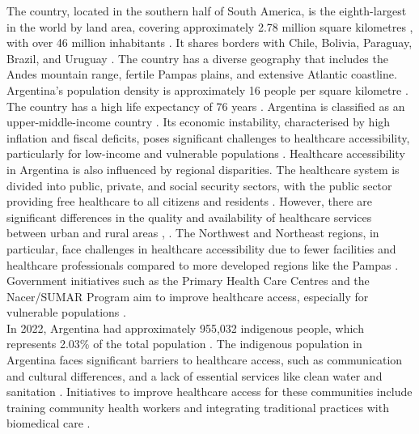 \documentclass[11pt, a4paper]{report}
\begin{document}
The country, located in the southern half of South America, is the eighth-largest in the world by land area, covering approximately 2.78 million square kilometres \citep{runfola_geoboundaries_2020}, with over 46 million inhabitants \citep{united_nations_world_2022}. It shares borders with Chile, Bolivia, Paraguay, Brazil, and Uruguay \citep{runfola_geoboundaries_2020}. The country has a diverse geography that includes the Andes mountain range, fertile Pampas plains, and extensive Atlantic coastline.  \\
%
Argentina's population density is approximately 16 people per square kilometre \citep{united_nations_world_2022}.
The country has a high life expectancy of 76 years \citep{world_bank_life_2022}. 
%
Argentina is classified as an upper-middle-income country \citep{world_bank_world_2022}. Its economic instability, characterised by high inflation and fiscal deficits, poses significant challenges to healthcare accessibility, particularly for low-income and vulnerable populations \citep{world_bank_world_2024}. 
Healthcare accessibility in Argentina is also influenced by regional disparities. The healthcare system is divided into public, private, and social security sectors, with the public sector providing free healthcare to all citizens and residents \citep{bello_health_2011}. However, there are significant differences in the quality and availability of healthcare services between urban and rural areas \citep{vacarezza_exploring_2023}, \citep{palacios_need_2020}. The Northwest and Northeast regions, in particular, face challenges in healthcare accessibility due to fewer facilities and healthcare professionals compared to more developed regions like the Pampas \citep{gilardino_access_2016}. Government initiatives such as the Primary Health Care Centres and the Nacer/SUMAR Program aim to improve healthcare access, especially for vulnerable populations \citep{palacios_need_2020}. \\
%
In 2022, Argentina had approximately 955,032 indigenous people, which represents 2.03\% of the total population \citep{berger_indigenous_2024}. The indigenous population in Argentina faces significant barriers to healthcare access, such as communication and cultural differences, and a lack of essential services like clean water and sanitation \citep{quintana_access_2021}. Initiatives to improve healthcare access for these communities include training community health workers and integrating traditional practices with biomedical care \citep{quintana_access_2021}.
\end{document}
